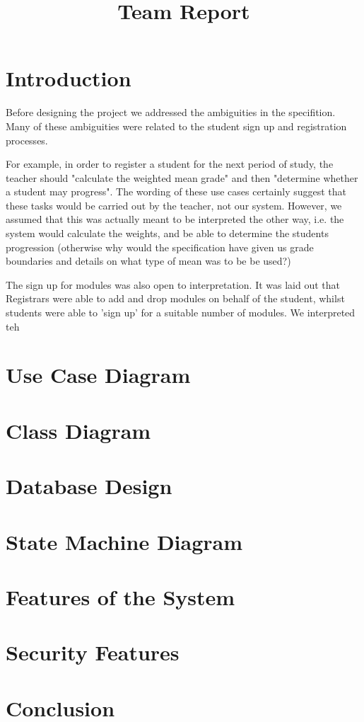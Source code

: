 \documentclass[12pt,a4paper,oneside,draft]{article}
\title{Team Report}
\date{} %
\begin{document}
\maketitle

\section{Introduction}
Before designing the project we addressed the ambiguities in the specifition.
Many of these ambiguities were related to the student sign up and registration
processes. 

For example, in order to register a student for the next period of study, the
teacher  should "calculate the weighted mean grade" and then "determine
whether a student may progress". The wording of these use cases certainly suggest that
these tasks would be carried out by the teacher, not our system. However, we assumed
that this was actually meant to be interpreted the other way, i.e. the system
would calculate the weights, and be able to determine the students progression
(otherwise why would the specification have given us grade boundaries and details on what
type of mean was to be be used?) 

The sign up for modules was also open to interpretation. It was laid out that
Registrars were able to add and drop modules on behalf of the student, whilst
students were able to 'sign up' for a suitable number of modules. We interpreted
teh 




\section{Use Case Diagram}






\section{Class Diagram}

\section{Database Design}

\section{State Machine Diagram}

\section{Features of the System}

\section{Security Features}

\section{Conclusion}
\end{document}

